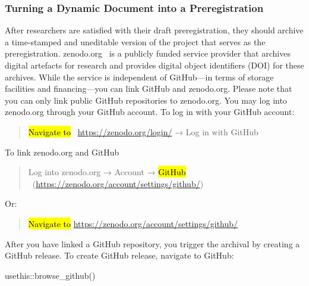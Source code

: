 \documentclass[psych,tutorial,accept,moreauthors,pdftex]{Definitions/mdpi}
\newenvironment{Shaded}{\begin{snugshade}}{\end{snugshade}}
\newcommand{\FunctionTok}[1]{\textcolor[rgb]{0.00,0.00,0.00}{#1}}
\newcommand{\NormalTok}[1]{#1}
\newcommand{\SpecialCharTok}[1]{\textcolor[rgb]{0.00,0.00,0.00}{#1}}
\begin{document}
\begin{paracol}{2}
\subsubsection*{Turning a Dynamic Document into a
Preregistration}\label{turning-a-dynamic-document-into-a-preregistration}

After researchers are satisfied with their draft preregistration, they
should archive a time-stamped and uneditable version of the project that
serves as the preregistration. zenodo.org~\citep{zenodo} is a publicly
funded service provider that archives digital artefacts for research and
provides digital object identifiers (DOI) for these archives. While the
service is independent of GitHub---in terms of storage facilities and
financing---you can link GitHub and zenodo.org. Please note that you can
only link public GitHub repositories to zenodo.org. You may log into
zenodo.org through your GitHub account. To log in with your GitHub
account:

\begin{quote}
\hl{Navigate to} %
~\url{https://zenodo.org/login/} → Log in with GitHub
\end{quote}

\noindent{}To link zenodo.org and GitHub

\begin{quote}
Log into zenodo.org → Account → \hl{GitHub} %
~({\url{https://zenodo.org/account/settings/github/}})
\end{quote}

\noindent{}Or:

\begin{quote}
\hl{Navigate to} %
 \url{https://zenodo.org/account/settings/github/}
\end{quote}

After you have linked a GitHub repository, you trigger the archival by
creating a GitHub release. To create GitHub release, navigate to GitHub:

\begin{adjustwidth}{0.5cm}{0cm} 
\begin{Shaded}
\begin{Highlighting}[]
\NormalTok{usethis}\SpecialCharTok{::}\FunctionTok{browse\_github}\NormalTok{()}
\end{Highlighting}
\end{Shaded}
\end{adjustwidth}


\end{paracol}
\end{document}
